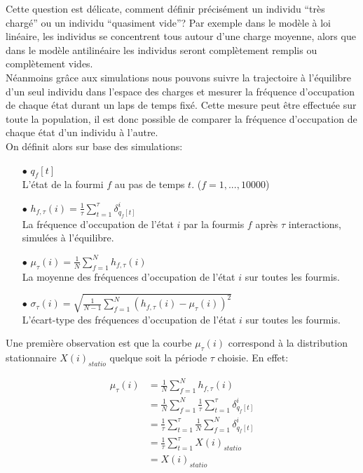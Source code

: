 Cette question est délicate, comment définir précisément un individu ``très chargé'' ou un individu ``quasiment vide''? Par exemple dans le modèle à loi linéaire, les individus se concentrent tous autour d'une charge moyenne, alors que dans le modèle antilinéaire les individus seront complètement remplis ou complètement vides.\\

Néanmoins grâce aux simulations nous pouvons suivre la trajectoire à l'équilibre d'un seul individu dans l'espace des charges et mesurer la fréquence d'occupation de chaque état durant un laps de temps fixé. Cette mesure peut être effectuée sur toute la population, il est donc possible de comparer la fréquence d'occupation de chaque état d'un individu à l'autre.\\


On définit alors sur base des simulations:

\begin{itemize}

\item[$\bullet$] $q_f[t]$\\
L'état de la fourmi $f$ au pas de temps $t$. ($f=1,...,10000$)\\

\item[$\bullet$] $h_{f,\tau}(i)=\frac{1}{\tau} \sum_{t=1}^{\tau}\delta_{q_f[t]}^i$ \\
La fréquence d'occupation de l'état $i$ par la fourmis $f$ après $\tau$ interactions, simulées à l'équilibre.\\


\item[$\bullet$] $\mu_{\tau}(i) = \frac{1}{N}\sum_{f=1}^N h_{f,\tau}(i)$ \\
La moyenne des fréquences d'occupation de l'état $i$ sur toutes les fourmis.\\

\item[$\bullet$] $\sigma_{\tau}(i) = \sqrt{\frac{1}{N-1}\sum_{f=1}^N (h_{f,\tau}(i)-\mu_{\tau}(i))^2}$ \\
L'écart-type des fréquences d'occupation de l'état $i$ sur toutes les fourmis.\\
\end{itemize}

Une première observation est que la courbe $\mu_{\tau}(i)$ correspond à la distribution stationnaire $X(i)_{statio}$ quelque soit la période $\tau$ choisie. En effet:

\begin{equation}
\begin{aligned}
\mu_{\tau}(i) 	&= \frac{1}{N}\sum_{f=1}^N h_{f,\tau}(i)\\
				&= \frac{1}{N}\sum_{f=1}^N \frac{1}{\tau} \sum_{t=1}^{\tau}\delta_{q_f[t]}^i\\
				&= \frac{1}{\tau} \sum_{t=1}^{\tau} \frac{1}{N}\sum_{f=1}^N \delta_{q_f[t]}^i\\
				&= \frac{1}{\tau} \sum_{t=1}^{\tau} X(i)_{statio}\\
				&= X(i)_{statio}
\end{aligned}
\end{equation}

